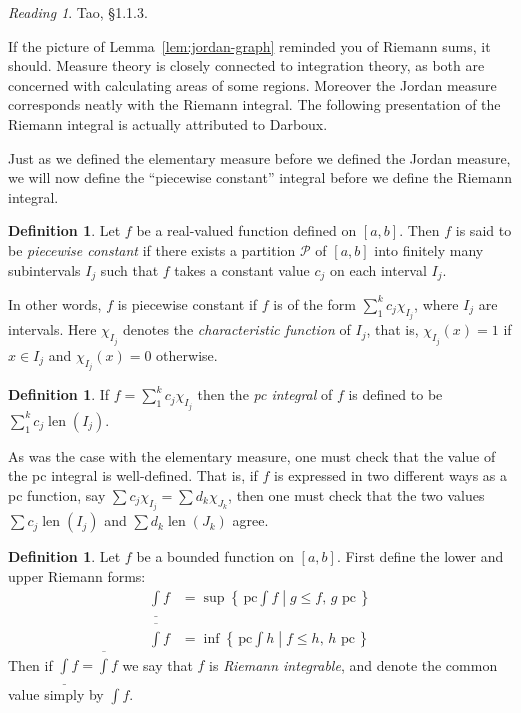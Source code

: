 \documentclass[11pt,oneside]{amsbook}
\newcommand{\set}[1]{\left\{\,#1\,\right\}}
\DeclareMathOperator{\len}{len}
\newcommand{\lint}{\underline\int}
\newcommand{\ovint}{\overline\int}
\theoremstyle{definition}
\theoremstyle{plain}
\theoremstyle{definition}
\newtheorem{defn}[thm]{Definition}
\theoremstyle{remark}
\newtheorem*{reading}{Reading}
\numberwithin{equation}{section}
\numberwithin{figure}{section}
\begin{document}
\begin{reading}
  Tao, \S1.1.3.
\end{reading}

If the picture of Lemma~\ref{lem:jordan-graph} reminded you of Riemann sums, it should. Measure theory is closely connected to integration theory, as both are concerned with calculating areas of some regions. Moreover the Jordan measure corresponds neatly with the Riemann integral. The following presentation of the Riemann integral is actually attributed to Darboux.

Just as we defined the elementary measure before we defined the Jordan measure, we will now define the ``piecewise constant'' integral before we define the Riemann integral.

\begin{defn}
  Let $f$ be a real-valued function defined on $[a,b]$. Then $f$ is said to be \emph{piecewise constant} if there exists a partition $\mathcal P$ of $[a,b]$ into finitely many subintervals $I_j$ such that $f$ takes a constant value $c_j$ on each interval $I_j$.
\end{defn}

In other words, $f$ is piecewise constant if $f$ is of the form $\sum_1^k c_j\chi_{I_j}$, where $I_j$ are intervals. Here $\chi_{I_j}$ denotes the \emph{characteristic function} of $I_j$, that is, $\chi_{I_j}(x)=1$ if $x\in I_j$ and $\chi_{I_j}(x)=0$ otherwise.

\begin{defn}
  If $f=\sum_1^kc_j\chi_{I_j}$ then the \emph{pc integral} of $f$ is defined to be $\sum_1^kc_j\len(I_j)$.
\end{defn}

As was the case with the elementary measure, one must check that the value of the pc integral is well-defined. That is, if $f$ is expressed in two different ways as a pc function, say $\sum c_j\chi_{I_j}=\sum d_k\chi_{J_k}$, then one must check that the two values $\sum c_j\len(I_j)$ and $\sum d_k\len(J_k)$ agree.

\begin{defn}
  Let $f$ be a bounded function on $[a,b]$. First define the lower and upper Riemann forms:
  \begin{align*}
    \lint f&=\sup\set{\left.\text{pc}\!\!\int\!\! f\;\right|\;g\leq f\text{, $g$ pc}}\\
    \ovint f&=\inf\set{\left.\text{pc}\!\!\int\!\! h\;\right|\;f\leq h\text{, $h$ pc}}
  \end{align*}
  Then if $\lint f=\ovint f$ we say that $f$ is \emph{Riemann integrable}, and denote the common value simply by $\int f$.
\end{defn}
\end{document}
